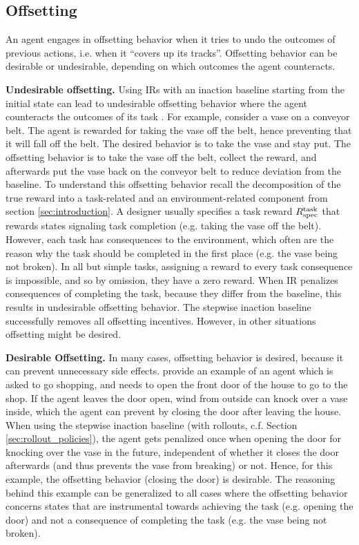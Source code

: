 \documentclass[letterpaper]{article} %
\newcommand{\Rtask}{R^{\textnormal{task}}}
\begin{document}
\subsection{Offsetting}\label{sec:offsetting}
An agent engages in offsetting behavior when it tries to undo the outcomes of previous actions, i.e. when it ``covers up its tracks''. Offsetting behavior can be desirable or undesirable, depending on which outcomes the agent counteracts. 

\textbf{Undesirable offsetting.}
Using IRs with an inaction baseline starting from the initial state can lead to undesirable offsetting behavior where the agent counteracts the outcomes of its task \citep{krakovna2018penalizing, turner2020conservative}. 
For example, \citet{krakovna2018penalizing} consider a vase on a conveyor belt. The agent is rewarded for taking the vase off the belt, hence preventing that it will fall off the belt. The desired behavior is to take the vase and stay put. The offsetting behavior is to take the vase off the belt, collect the reward, and afterwards put the vase back on the conveyor belt to reduce deviation from the baseline.
To understand this offsetting behavior recall the decomposition of the true reward into a task-related and an environment-related component from section \ref{sec:introduction}. A designer usually specifies a task reward $\Rtask_{\textnormal{spec}}$ that rewards states signaling task completion (e.g. taking the vase off the belt). However, each task has consequences to the environment, which often are the reason why the task should be completed in the first place (e.g. the vase being not broken). In all but simple tasks, assigning a reward to every task consequence is impossible, and so by omission, they have a zero reward. When IR penalizes consequences of completing the task, because they differ from the baseline, this results in undesirable offsetting behavior. The stepwise inaction baseline \citep{turner2020avoiding} successfully removes all offsetting incentives. However, in other situations offsetting might be desired.

\textbf{Desirable Offsetting.}
In many cases, offsetting behavior is desired, because it can prevent unnecessary side effects. \citet{krakovna2020avoiding} provide an example of an agent which is asked to go shopping, and needs to open the front door of the house to go to the shop. If the agent leaves the door open, wind from outside can knock over a vase inside, which the agent can prevent by closing the door after leaving the house. When using the stepwise inaction baseline (with rollouts, c.f. Section \ref{sec:rollout_policies}), the agent gets penalized once when opening the door for knocking over the vase in the future, independent of whether it closes the door afterwards (and thus prevents the vase from breaking) or not. Hence, for this example, the offsetting behavior (closing the door) is desirable. The reasoning behind this example can be generalized to all cases where the offsetting behavior concerns states that are instrumental towards achieving the task (e.g. opening the door) and not a consequence of completing the task (e.g. the vase being not broken).
\end{document}
